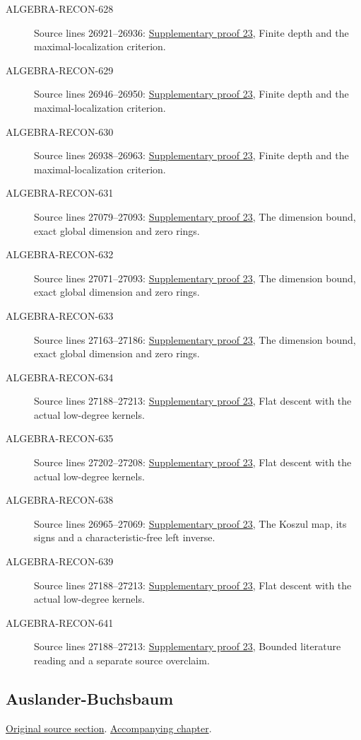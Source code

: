 \begin{description}
\item[ALGEBRA-RECON-628] Source lines 26921--26936: \hyperlink{algebra_regular_ab_notes_20260928}{Supplementary proof 23}, Finite depth and the maximal-localization criterion.
\item[ALGEBRA-RECON-629] Source lines 26946--26950: \hyperlink{algebra_regular_ab_notes_20260928}{Supplementary proof 23}, Finite depth and the maximal-localization criterion.
\item[ALGEBRA-RECON-630] Source lines 26938--26963: \hyperlink{algebra_regular_ab_notes_20260928}{Supplementary proof 23}, Finite depth and the maximal-localization criterion.
\item[ALGEBRA-RECON-631] Source lines 27079--27093: \hyperlink{algebra_regular_ab_notes_20260928}{Supplementary proof 23}, The dimension bound, exact global dimension and zero rings.
\item[ALGEBRA-RECON-632] Source lines 27071--27093: \hyperlink{algebra_regular_ab_notes_20260928}{Supplementary proof 23}, The dimension bound, exact global dimension and zero rings.
\item[ALGEBRA-RECON-633] Source lines 27163--27186: \hyperlink{algebra_regular_ab_notes_20260928}{Supplementary proof 23}, The dimension bound, exact global dimension and zero rings.
\item[ALGEBRA-RECON-634] Source lines 27188--27213: \hyperlink{algebra_regular_ab_notes_20260928}{Supplementary proof 23}, Flat descent with the actual low-degree kernels.
\item[ALGEBRA-RECON-635] Source lines 27202--27208: \hyperlink{algebra_regular_ab_notes_20260928}{Supplementary proof 23}, Flat descent with the actual low-degree kernels.
\item[ALGEBRA-RECON-638] Source lines 26965--27069: \hyperlink{algebra_regular_ab_notes_20260928}{Supplementary proof 23}, The Koszul map, its signs and a characteristic-free left inverse.
\item[ALGEBRA-RECON-639] Source lines 27188--27213: \hyperlink{algebra_regular_ab_notes_20260928}{Supplementary proof 23}, Flat descent with the actual low-degree kernels.
\item[ALGEBRA-RECON-641] Source lines 27188--27213: \hyperlink{algebra_regular_ab_notes_20260928}{Supplementary proof 23}, Bounded literature reading and a separate source overclaim.
\end{description}

\subsection{Auslander-Buchsbaum}
\hypertarget{algebra-source-section-Auslander-Buchsbaum}{}
\noindent\href{https://github.com/stacks/stacks-project/blob/a04446e57ec1fbc252a871afcec7752fb2807b14/algebra.tex\#L27222}{Original source section}. \href{algebra.pdf\#nameddest=section-Auslander-Buchsbaum}{Accompanying chapter}.

